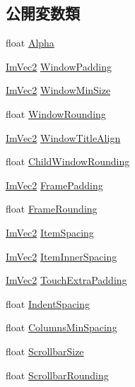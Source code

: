 \subsection*{公開変数類}
\begin{DoxyCompactItemize}
\item 
float \mbox{\hyperlink{struct_im_gui_style_a993312606e9dcb7ca165245150a4da72}{Alpha}}
\item 
\mbox{\hyperlink{struct_im_vec2}{Im\+Vec2}} \mbox{\hyperlink{struct_im_gui_style_a37f156b53e6dcc99ff57366ceafe8b50}{Window\+Padding}}
\item 
\mbox{\hyperlink{struct_im_vec2}{Im\+Vec2}} \mbox{\hyperlink{struct_im_gui_style_a060b2f743a086d0f0fee4cd5b3f372d4}{Window\+Min\+Size}}
\item 
float \mbox{\hyperlink{struct_im_gui_style_acd902c2ab4b53d4bb0f64da608320894}{Window\+Rounding}}
\item 
\mbox{\hyperlink{struct_im_vec2}{Im\+Vec2}} \mbox{\hyperlink{struct_im_gui_style_a3fc57a15ab8f206045f1e5dfccd8b2e7}{Window\+Title\+Align}}
\item 
float \mbox{\hyperlink{struct_im_gui_style_a4c7010149e61a5d2d954710f9f22b767}{Child\+Window\+Rounding}}
\item 
\mbox{\hyperlink{struct_im_vec2}{Im\+Vec2}} \mbox{\hyperlink{struct_im_gui_style_af58dc4e954ac95fdb3b0df8efb2fa564}{Frame\+Padding}}
\item 
float \mbox{\hyperlink{struct_im_gui_style_a15402cededdef985487e986ccce73ad2}{Frame\+Rounding}}
\item 
\mbox{\hyperlink{struct_im_vec2}{Im\+Vec2}} \mbox{\hyperlink{struct_im_gui_style_a6bc07d81e049cd75e86e6b3753c0da4a}{Item\+Spacing}}
\item 
\mbox{\hyperlink{struct_im_vec2}{Im\+Vec2}} \mbox{\hyperlink{struct_im_gui_style_a1a12021be99583fb491cff2df75d1ae1}{Item\+Inner\+Spacing}}
\item 
\mbox{\hyperlink{struct_im_vec2}{Im\+Vec2}} \mbox{\hyperlink{struct_im_gui_style_ab518a0a67df8f14765acc491d7b460f4}{Touch\+Extra\+Padding}}
\item 
float \mbox{\hyperlink{struct_im_gui_style_a32ea292dee2b4e178a227acacd061921}{Indent\+Spacing}}
\item 
float \mbox{\hyperlink{struct_im_gui_style_a8fed04481e1d75bb95c97819f545e2ba}{Columns\+Min\+Spacing}}
\item 
float \mbox{\hyperlink{struct_im_gui_style_a96623380e624d2f2ec207449e700a226}{Scrollbar\+Size}}
\item 
float \mbox{\hyperlink{struct_im_gui_style_a00efbadb1ad7daa0ee7384864b147d71}{Scrollbar\+Rounding}}

\end{DoxyCompactItemize}
